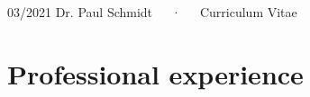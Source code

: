 \documentclass[11pt, a4paper]{awesome-cv}
\begin{document}
\makecvheader

\makecvfooter
  {03/2021}
    {Dr. Paul Schmidt~~~·~~~Curriculum Vitae}
  {\thepage}






\hypertarget{professional-experience}{%
\section{Professional experience}\label{professional-experience}}
\end{document}
